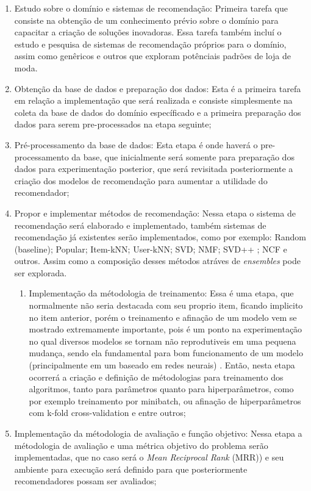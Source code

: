 \documentclass{article}
\begin{document}
\begin{enumerate}
   \item Estudo sobre o domínio e sistemas de recomendação: Primeira tarefa que consiste na obtenção de um conhecimento prévio sobre o domínio para capacitar a criação de soluções inovadoras. Essa tarefa também incluí o estudo e pesquisa de sistemas de recomendação próprios para o domínio, assim como genêricos e outros que exploram potênciais padrões de loja de moda.
   \item Obtenção da base de dados e preparação dos dados: Esta é a primeira tarefa em relação a implementação que será realizada e consiste simplesmente na coleta da base de dados do domínio específicado e a primeira preparação dos dados para serem pre-processados na etapa seguinte;
   \item Pré-processamento da base de dados: Esta etapa é onde haverá o pre-processamento da base, que inicialmente será somente para preparação dos dados para experimentação posterior, que será revisitada posteriormente a criação dos modelos de recomendação para aumentar a utilidade do recomendador;
   \item Propor e implementar métodos de recomendação: Nessa etapa o sistema de recomendação será elaborado e implementado, também sistemas de recomendação já existentes serão implementados, como por exemplo: Random (baseline); Popular; Item-kNN; User-kNN; SVD; NMF; SVD++ \cite{koren2008factorization}; NCF \cite{he2017neural} e outros. Assim como a composição desses métodos atráves de \textit{ensembles} pode ser explorada.
\begin{enumerate}[label*=\arabic*.]
   \item Implementação da métodologia de treinamento: Essa é uma etapa, que normalmente não seria destacada com seu proprio item, ficando implicito no item anterior, porém o treinamento e afinação de um modelo vem se mostrado extremamente importante, pois é um ponto na experimentação no qual diversos modelos se tornam não reprodutiveis em uma pequena mudança, sendo ela fundamental para bom funcionamento de um modelo (principalmente em um baseado em redes neurais) \cite{crane2018questionable,dacrema2019we}. Então, nesta etapa ocorrerá a criação e definição de métodologias para treinamento dos algoritmos, tanto para parâmetros quanto para hiperparâmetros, como por exemplo treinamento por minibatch, ou afinação de hiperparâmetros com k-fold cross-validation e entre outros;
\end{enumerate}
   \item Implementação da métodologia de avaliação e função objetivo: Nessa etapa a métodologia de avaliação e uma métrica objetivo do problema serão implementadas, que no caso será o \textit{Mean Reciprocal Rank} (MRR)) e seu ambiente para execução será definido para que posteriormente recomendadores possam ser avaliados;


\end{enumerate}
\end{document}
